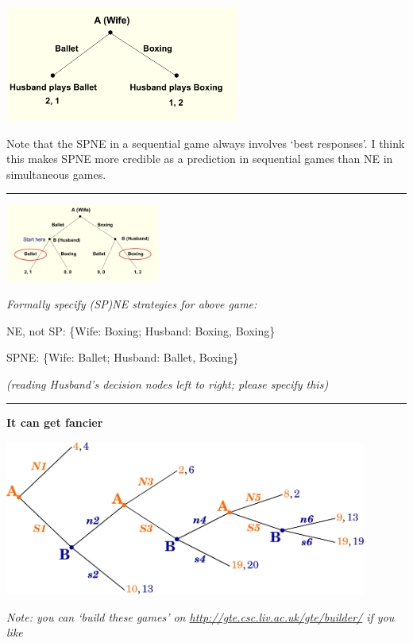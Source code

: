 \documentclass[]{article}
\begin{document}
\includegraphics[height=1.5in]{picsfigs/bosbwi2.png}

Note that the SPNE in a sequential game always involves `best responses'. I think this makes SPNE more credible as a prediction in sequential games than NE in simultaneous games.

\begin{center}\rule{0.5\linewidth}{\linethickness}\end{center}

\includegraphics[height=1in]{picsfigs/bosbwi1.png}

\emph{Formally specify (SP)NE strategies for above game:}

NE, not SP: \{Wife: Boxing; Husband: Boxing, Boxing\}

SPNE: \{Wife: Ballet; Husband: Ballet, Boxing\}

\emph{(reading Husband's decision nodes left to right; please specify this)}

\begin{center}\rule{0.5\linewidth}{\linethickness}\end{center}

\textbf{It can get fancier}

\includegraphics[height=2in]{picsfigs/longgamework_randompayoffs_noul.png}

\emph{Note: you can `build these games' on \url{http://gte.csc.liv.ac.uk/gte/builder/} if you like}
\end{document}
